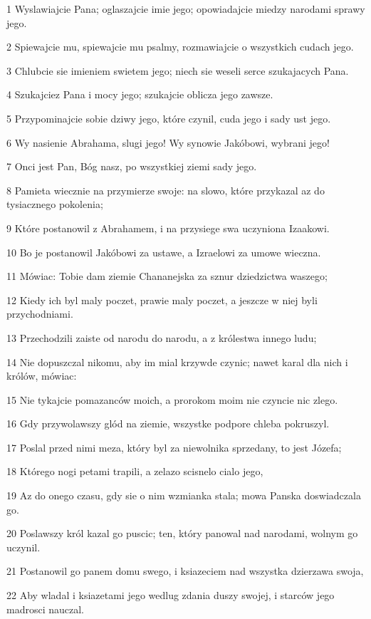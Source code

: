\par 1 Wyslawiajcie Pana; oglaszajcie imie jego; opowiadajcie miedzy narodami sprawy jego.
\par 2 Spiewajcie mu, spiewajcie mu psalmy, rozmawiajcie o wszystkich cudach jego.
\par 3 Chlubcie sie imieniem swietem jego; niech sie weseli serce szukajacych Pana.
\par 4 Szukajciez Pana i mocy jego; szukajcie oblicza jego zawsze.
\par 5 Przypominajcie sobie dziwy jego, które czynil, cuda jego i sady ust jego.
\par 6 Wy nasienie Abrahama, slugi jego! Wy synowie Jakóbowi, wybrani jego!
\par 7 Onci jest Pan, Bóg nasz, po wszystkiej ziemi sady jego.
\par 8 Pamieta wiecznie na przymierze swoje: na slowo, które przykazal az do tysiacznego pokolenia;
\par 9 Które postanowil z Abrahamem, i na przysiege swa uczyniona Izaakowi.
\par 10 Bo je postanowil Jakóbowi za ustawe, a Izraelowi za umowe wieczna.
\par 11 Mówiac: Tobie dam ziemie Chananejska za sznur dziedzictwa waszego;
\par 12 Kiedy ich byl maly poczet, prawie maly poczet, a jeszcze w niej byli przychodniami.
\par 13 Przechodzili zaiste od narodu do narodu, a z królestwa innego ludu;
\par 14 Nie dopuszczal nikomu, aby im mial krzywde czynic; nawet karal dla nich i królów, mówiac:
\par 15 Nie tykajcie pomazanców moich, a prorokom moim nie czyncie nic zlego.
\par 16 Gdy przywolawszy glód na ziemie, wszystke podpore chleba pokruszyl.
\par 17 Poslal przed nimi meza, który byl za niewolnika sprzedany, to jest Józefa;
\par 18 Którego nogi petami trapili, a zelazo scisnelo cialo jego,
\par 19 Az do onego czasu, gdy sie o nim wzmianka stala; mowa Panska doswiadczala go.
\par 20 Poslawszy król kazal go puscic; ten, który panowal nad narodami, wolnym go uczynil.
\par 21 Postanowil go panem domu swego, i ksiazeciem nad wszystka dzierzawa swoja,
\par 22 Aby wladal i ksiazetami jego wedlug zdania duszy swojej, i starców jego madrosci nauczal.

